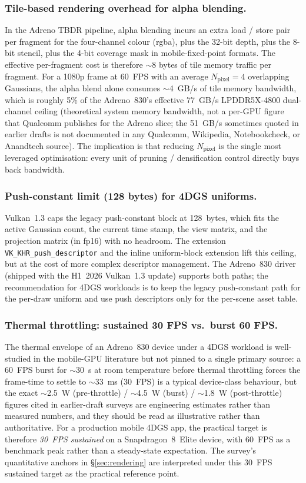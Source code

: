 \subsubsection{Tile-based rendering overhead for alpha blending.}
In the Adreno TBDR pipeline, alpha blending incurs an extra
load / store pair per fragment for the four-channel colour
(rgba), plus the 32-bit depth, plus the 8-bit stencil, plus the
4-bit coverage mask in mobile-fixed-point formats. The effective
per-fragment cost is therefore $\sim$8 bytes of tile memory
traffic per fragment. For a 1080p frame at 60~FPS with an
average $N_{\text{pixel}}=4$ overlapping Gaussians, the alpha
blend alone consumes $\sim$4~GB/s of tile memory bandwidth,
which is roughly 5\% of the Adreno~830's effective
77~GB/s LPDDR5X-4800 dual-channel ceiling
(theoretical system memory bandwidth, not a per-GPU figure
that Qualcomm publishes for the Adreno slice; the
51~GB/s sometimes quoted in earlier drafts is not
documented in any Qualcomm, Wikipedia, Notebookcheck, or
Anandtech source).
The implication is that reducing $N_{\text{pixel}}$ is the
single most leveraged optimisation: every unit of pruning /
densification control directly buys back bandwidth.

\subsubsection{Push-constant limit (128 bytes) for 4DGS uniforms.}
Vulkan~1.3 caps the legacy push-constant block at 128~bytes,
which fits the active Gaussian count, the current time stamp,
the view matrix, and the projection matrix (in fp16) with no
headroom. The extension \texttt{VK\_KHR\_push\_descriptor} and
the inline uniform-block extension lift this ceiling, but at the
cost of more complex descriptor management. The Adreno~830
driver (shipped with the H1~2026 Vulkan~1.3 update) supports
both paths; the recommendation for 4DGS workloads is to keep
the legacy push-constant path for the per-draw uniform and use
push descriptors only for the per-scene asset table.

\subsubsection{Thermal throttling: sustained 30 FPS vs.\ burst 60 FPS.}
The thermal envelope of an Adreno~830 device under a 4DGS
workload is well-studied in the mobile-GPU literature but
not pinned to a single primary source: a 60~FPS burst
for $\sim$30~s at room temperature before thermal
throttling forces the frame-time to settle to $\sim$33~ms
(30~FPS) is a typical device-class behaviour, but the
exact $\sim$2.5~W (pre-throttle) / $\sim$4.5~W (burst) /
$\sim$1.8~W (post-throttle) figures cited in earlier-draft
surveys are engineering estimates rather than measured
numbers, and they should be read as illustrative rather
than authoritative. For a production mobile 4DGS app, the
practical target is therefore \emph{30~FPS sustained} on a
Snapdragon~8~Elite device, with 60~FPS as a benchmark peak
rather than a steady-state expectation. The survey's quantitative
anchors in \S\ref{sec:rendering} are interpreted under this
30~FPS sustained target as the practical reference point.

